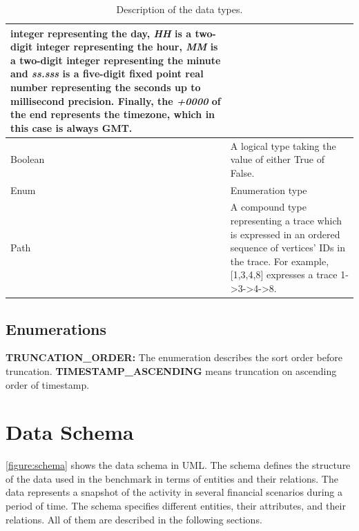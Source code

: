 \begin{table}[h]
\begin{tabular}{|>{\typeCell}p{\attributeColumnWidth}|p{\largeDescriptionColumnWidth}|}
        integer representing the day, \textit{HH} is a two-digit integer
        representing the hour, \textit{MM} is a two-digit integer representing
        the minute and \textit{ss.sss} is a five-digit fixed point real number
        representing the seconds up to millisecond precision. Finally, the
        \textit{+0000} of the end represents the timezone, which in this case is
        always GMT.                                                              \\
        \hline
        Boolean                 & A logical type taking the value of either True
        of False.                                                                \\
        \hline
        Enum                    & Enumeration type                               \\
        \hline
        Path                    & A compound type representing a trace which is
        expressed in an ordered sequence of vertices' IDs in the trace. For
        example, [1,3,4,8] expresses a trace 1->3->4->8.                         \\
        \hline
    \end{tabular}
    \caption{Description of the data types.}
    \label{table:types}
\end{table}

\subsection{Enumerations}
{\flushleft \textbf{TRUNCATION\_ORDER:}} The enumeration describes the sort
order before truncation. \textbf{TIMESTAMP\_ASCENDING} means truncation on
ascending order of timestamp.


\section{Data Schema}

\autoref{figure:schema} shows the data schema in UML. The schema defines the
structure of the data used in the benchmark in terms of entities and their
relations. The data represents a snapshot of the activity in several financial
scenarios during a period of time. The schema specifies different entities,
their attributes, and their relations. All of them are described in the
following sections.

